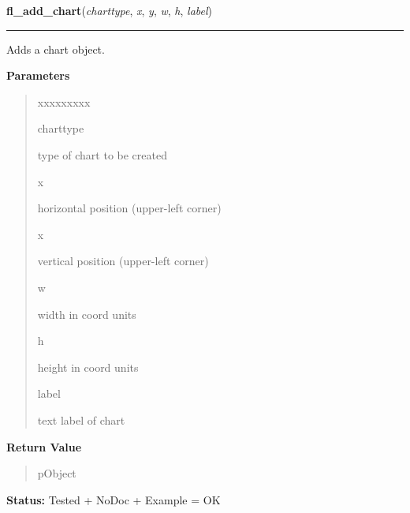     \label{xformslib:library:fl_add_chart}

    \vspace{0.5ex}

\hspace{.8\funcindent}\begin{boxedminipage}{\funcwidth}

    \raggedright \textbf{fl\_add\_chart}(\textit{charttype}, \textit{x}, \textit{y}, \textit{w}, \textit{h}, \textit{label})

    \vspace{-1.5ex}

    \rule{\textwidth}{0.5\fboxrule}
\setlength{\parskip}{2ex}
    Adds a chart object.

\setlength{\parskip}{1ex}
      \textbf{Parameters}
      \vspace{-1ex}

      \begin{quote}
        \begin{Ventry}{xxxxxxxxx}

          \item[charttype]

          type of chart to be created

          \item[x]

          horizontal position (upper-left corner)

          \item[x]

          vertical position (upper-left corner)

          \item[w]

          width in coord units

          \item[h]

          height in coord units

          \item[label]

          text label of chart

        \end{Ventry}

      \end{quote}

      \textbf{Return Value}
    \vspace{-1ex}

      \begin{quote}
      pObject

      \end{quote}

\textbf{Status:} Tested + NoDoc + Example = OK



    \end{boxedminipage}

